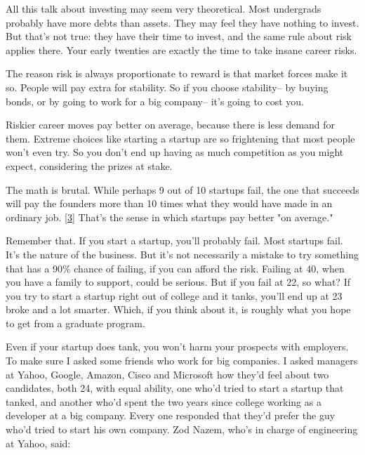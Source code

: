 All this talk about investing may
                    seem very theoretical. Most undergrads probably have more
                    debts than assets. They may feel they have nothing to
                    invest. But that's not true: they have their time to invest,
                    and the same rule about risk applies there. Your early
                    twenties are exactly the time to take insane career
                    risks.

The reason risk is always proportionate to
                    reward is that market forces make it so. People will pay
                    extra for stability. So if you choose stability-- by buying
                    bonds, or by going to work for a big company-- it's going to
                    cost you.

Riskier career moves pay better on
                    average, because there is less demand for them. Extreme
                    choices like starting a startup are so frightening that most
                    people won't even try. So you don't end up having as much
                    competition as you might expect, considering the prizes at
                    stake.

The math is brutal. While perhaps 9 out of
                    10 startups fail, the one that succeeds will pay the
                    founders more than 10 times what they would have made in an
                    ordinary job.
                    [\href{\#f3n}{3}]
                    That's the sense in which startups pay better "on
                    average."

Remember that. If you start a startup,
                    you'll probably fail. Most startups fail. It's the nature of
                    the business. But it's not necessarily a mistake to try
                    something that has a 90\% chance of failing, if you can
                    afford the risk. Failing at 40, when you have a family to
                    support, could be serious. But if you fail at 22, so what?
                    If you try to start a startup right out of college and it
                    tanks, you'll end up at 23 broke and a lot smarter. Which,
                    if you think about it, is roughly what you hope to get from
                    a graduate program.

Even if your startup does
                    tank, you won't harm your prospects with employers. To make
                    sure I asked some friends who work for big companies. I
                    asked managers at Yahoo, Google, Amazon, Cisco and Microsoft
                    how they'd feel about two candidates, both 24, with equal
                    ability, one who'd tried to start a startup that tanked, and
                    another who'd spent the two years since college working as a
                    developer at a big company. Every one responded that they'd
                    prefer the guy who'd tried to start his own company. Zod
                    Nazem, who's in charge of engineering at Yahoo, said:
                  


